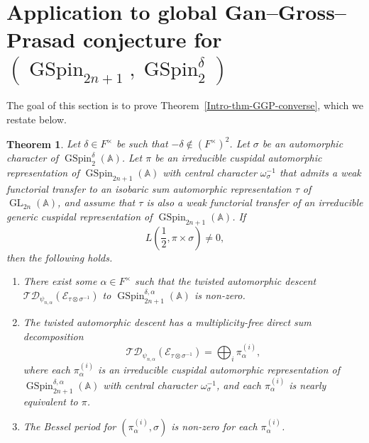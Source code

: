 \documentclass[12pt]{amsart}
\newcommand{\A}{\mathbb{A}}
\newcommand{\TD}{\mathcal{TD}}
\newcommand{\CE}{{\mathcal{E}}}
\newtheorem{theorem}{Theorem}[section]
\theoremstyle{remark}
\DeclareMathOperator{\GL}{GL}
\DeclareMathOperator{\GSpin}{GSpin}
\begin{document}
 

\section{Application to global Gan--Gross--Prasad conjecture for $(\GSpin_{2n+1}, \GSpin^{\delta}_2)$}
\label{section-application-GGP}

The goal of this section is to prove Theorem~\ref{Intro-thm-GGP-converse}, which we restate below. 

\begin{theorem}
\label{thm-GGP-converse}
Let $\delta\in F^\times$ be such that $-\delta\not\in (F^\times)^2$. 
Let $\sigma$ be an automorphic character of $\GSpin_2^{\delta}(\A)$.
Let $\pi$ be an irreducible cuspidal automorphic representation of $\GSpin_{2n+1}(\A)$ with central character $\omega_{\sigma}^{-1}$ that admits a weak functorial transfer to an isobaric sum automorphic representation $\tau$ of $\GL_{2n}(\A)$, and assume that $\tau$ is also a weak functorial transfer of an irreducible generic cuspidal representation of $\GSpin_{2n+1}(\A)$.
If
\begin{equation*}
L(\frac{1}{2}, \pi\times\sigma )\not=0,	
\end{equation*}
then the following holds.
\begin{enumerate}
\item There exist some $\alpha\in F^\times$ such that the twisted automorphic descent $\TD_{\psi_{n,\alpha}}(\CE_{\tau\otimes\sigma^{-1}})$ to $\GSpin^{\delta,\alpha}_{2n+1}(\A)$ is non-zero.
\item The twisted automorphic descent has a multiplicity-free direct sum decomposition
\begin{equation*}
\TD_{\psi_{n,\alpha}}(\CE_{\tau\otimes\sigma^{-1}})= \bigoplus_{i} \pi_\alpha^{(i)},	
\end{equation*}
where each $\pi_\alpha^{(i)}$ is an irreducible cuspidal automorphic representation of $\GSpin^{\delta,\alpha}_{2n+1}(\A)$ with central character $\omega_{\sigma}^{-1}$, and each $\pi_\alpha^{(i)}$ is nearly equivalent to $\pi$.
\item 	The Bessel period for $(\pi_{\alpha}^{(i)}, \sigma)$ is non-zero for each $\pi_{\alpha}^{(i)}$.
\end{enumerate} 
\end{theorem}
\end{document}
